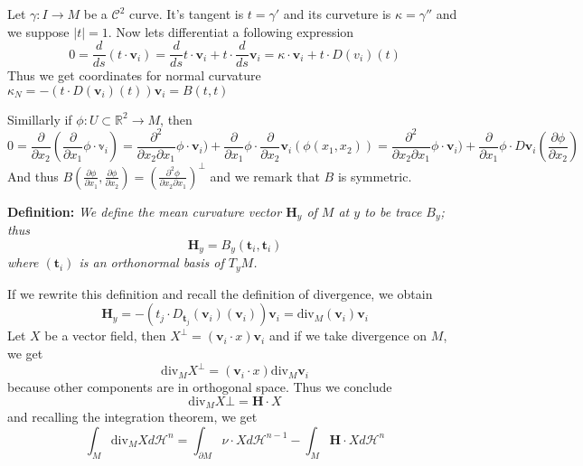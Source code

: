 \vspace{2ex}
Let $\gamma:I\rightarrow M$ be a $\mathcal C^2$ curve. It's tangent is $t=\gamma'$
and its curveture is $\kappa=\gamma''$ and we suppose $|t|=1$. Now lets
differentiat a following expression
\[0=\frac{d}{ds}(t\cdot\mathbf v_i)=\frac{d}{ds}t\cdot\mathbf v_i+t\cdot\frac{d}{ds}\mathbf v_i=\kappa\cdot\mathbf v_i+t\cdot D(v_i)(t)\]
Thus we get coordinates for normal curvature
$\kappa_N = -(t\cdot D(\mathbf v_i)(t))\mathbf v_i=B(t,t)$

\vspace{2ex}
Simillarly if $\phi:U\subset\mathbb R^2\rightarrow M$, then
\[0=\frac{\partial}{\partial x_2}(\frac{\partial}{\partial x_1}\phi\cdot\mathbb{v}_i)=
\frac{\partial^2}{\partial x_2\partial x_1}\phi\cdot\mathbf{v}_i)+\frac{\partial}{\partial x_1}\phi\cdot\frac{\partial}{\partial x_2}\mathbf{v}_i(\phi(x_1,x_2))=
\frac{\partial^2}{\partial x_2\partial x_1}\phi\cdot\mathbf{v}_i)+\frac{\partial}{\partial x_1}\phi\cdot D\mathbf{v}_i(\frac{\partial\phi}{\partial x_2})
\]
And thus $B(\frac{\partial\phi}{\partial x_1},\frac{\partial\phi}{\partial x_2})=(\frac{\partial^2\phi}{\partial x_2\partial x_1})^\bot$
and we remark that $B$ is symmetric.

\vspace{2ex}
\textbf{Definition:} \textit{We define the mean curvature vector $\mathbf H_y$
of $M$ at $y$ to be trace $B_y$; thus}
\[\mathbf H_y=B_y(\mathbf t_i,\mathbf t_i)\]
\textit{where $(\mathbf t_i)$ is an orthonormal basis of $T_yM$.}

\vspace{2ex}
If we rewrite this definition and recall the definition of divergence, we obtain
\[\mathbf H_y=-(t_j\cdot D_{\mathbf t_j}(\mathbf v_i)(\mathbf v_i))\mathbf v_i=\text{div}_M(\mathbf v_i)\mathbf v_i\]
Let $X$ be a vector field, then $X^\bot=(\mathbf v_i\cdot x)\mathbf v_i$ and if we take divergence on $M$, we get
\[\text{div}_M X^\bot=(\mathbf v_i\cdot x)\text{div}_M \mathbf v_i\]
because other components are in orthogonal space. Thus we conclude
\[\text{div}_M X\bot=\mathbf H\cdot X\]
and recalling the integration theorem, we get
\[\int_M \text{div}_MXd\mathcal H^n=\int_{\partial M}\nu\cdot Xd\mathcal H^{n-1}-\int_M \mathbf H\cdot Xd\mathcal H^n\]
